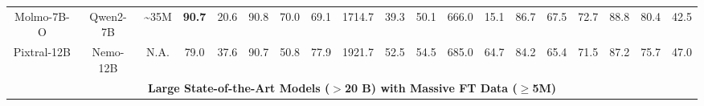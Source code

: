 \begin{table*}[ht]
{\begin{tabular}{ccc|cccccccccccccccc}
        Molmo-7B-O & \hspace{-0.9em}Qwen2-7B & \hspace{-0.9em}\textasciitilde35M & \hspace{-0.5em}\textbf{90.7} & \hspace{-0.9em}20.6 & \hspace{-0.9em}90.8 & \hspace{-0.9em}70.0 & \hspace{-0.9em}69.1 & \hspace{-0.9em}1714.7 & \hspace{-0.9em}39.3 & \hspace{-0.9em}50.1 & \hspace{-0.9em}666.0 & \hspace{-0.9em}15.1 & \hspace{-0.9em}86.7 & \hspace{-0.9em}67.5 & \hspace{-0.9em}72.7 & \hspace{-0.9em}88.8 & \hspace{-0.9em}80.4 & \hspace{-0.9em}42.5 \\ 
        \rowcolor{tablegray}
        Pixtral-12B & \hspace{-0.9em}Nemo-12B & \hspace{-0.9em}N.A. & \hspace{-0.5em}79.0 & \hspace{-0.9em}37.6 & \hspace{-0.9em}90.7 & \hspace{-0.9em}50.8 & \hspace{-0.9em}77.9 & \hspace{-0.9em}1921.7 & \hspace{-0.9em}52.5 & \hspace{-0.9em}54.5 & \hspace{-0.9em}685.0 & \hspace{-0.9em}64.7 & \hspace{-0.9em}84.2 & \hspace{-0.9em}65.4 & \hspace{-0.9em}71.5 & \hspace{-0.9em}87.2 & \hspace{-0.9em}75.7 & \hspace{-0.9em}47.0 \\ 
        \midrule
        \multicolumn{19}{c}{\textbf{Large State-of-the-Art Models ($>$20 B) with Massive FT Data ($\geq$5M)}} \\
        \midrule 

\end{tabular}}
\end{table*}

